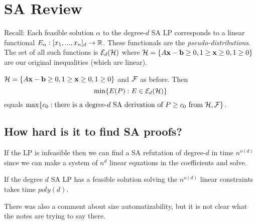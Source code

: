 



\section{SA Review}
Recall: Each feasible solution $\alpha$ to the degree-$d$ SA LP corresponds to a linear functional $E_{\alpha}: [x_1, ..., x_n]_d \rightarrow \mathbb{R}$. These functionals are the \emph{pseudo-distributions}. The set of all such functions is $\mathcal{E}_d(\mathcal{H})$ where $\mathcal{H} = \{A\mathbf{x} - \mathbf{b} \geq 0, 1 \geq \mathbf{x} \geq 0, 1 \geq 0\}$ are our original inequalities (which are linear). 

\begin{lemma}
$\mathcal{H} = \{A\mathbf{x} - \mathbf{b} \geq 0, 1 \geq \mathbf{x} \geq 0, 1 \geq 0\}$ and $\mathcal{F}$ as before. Then 
\[\min \{E(P): E \in \mathcal{E}_d(\mathcal{H})\}\]
equals $\max\{c_0: \mbox{there is a degree-$d$ SA derivation of $P \geq c_0$ from }\mathcal{H}, \mathcal{F}\}$.
\end{lemma}

\subsection{How hard is it to find SA proofs?}
If the LP is infeasible then we can find a SA refutation of degree-$d$ in time $n^{o(d)}$ since we can make a system of $n^d$ linear equations in the coefficients and solve.

If the degree $d$ SA LP has a feasible solution solving the $n^{o(d)}$ linear constraints takes time  $poly(d)$.  

There was also a comment about size automatizability, but it is not clear what the notes are trying to say there.

